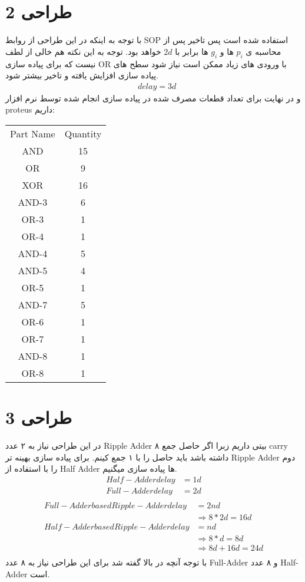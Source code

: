 \documentclass[11pt]{article}
\begin{document}
\section{طراحی 2}
با توجه به اینکه در این طراحی از روابط SOP استفاده شده است پس تاخیر پس از محاسبه ی $p_i$ ها و $g_i$ ها برابر با $2d$ خواهد بود. توجه به این نکته هم خالی از لطف نیست که برای پیاده سازی OR با ورودی های زیاد ممکن است نیاز شود سطح های پیاده سازی افزایش یافته و تاخیر بیشتر شود.
\begin{align*}
	&delay = 3d
\end{align*}
و در نهایت برای تعداد قطعات مصرف شده در پیاده سازی انجام شده توسط نرم افزار proteus داریم:
\begin{center}
	\begin{tabular}{c | c}
		Part Name & Quantity \\
		AND & 15 \\
		OR & 9 \\
		XOR & 16 \\
		AND-3 & 6 \\
		OR-3 & 1 \\
		OR-4 & 1 \\
		AND-4 & 5 \\
		AND-5 & 4 \\
		OR-5 & 1 \\
		AND-7 & 5 \\
		OR-6 & 1 \\
		OR-7 &  1 \\
		AND-8 & 1 \\
		OR-8 & 1 \\
	\end{tabular}
\end{center}
\section{طراحی 3}
در این طراحی نیاز به ۲ عدد Ripple Adder ۸ بیتی داریم زبرا اگر حاصل جمع carry داشته باشد باید حاصل را با ۱ جمع کینم. برای پیاده سازی بهینه تر Ripple Adder دوم را با استفاده از Half Adder ها پیاده سازی میگنیم.
\begin{align*}
	Half-Adder delay &= 1d \\
	Full-Adder delay &= 2d \\
\end{align*}
\begin{align*}
	Full-Adder based Ripple-Adder delay &= 2nd \\
	&\Rightarrow 8 * 2d = 16d \\
	Half-Adder based Ripple-Adder delay &= nd \\
	&\Rightarrow 8 * d = 8d \\
	&\Longrightarrow 8d + 16d = 24d \\
\end{align*}
با توجه آنچه در بالا گفته شد برای این طراحی نیاز به ۸ عدد Full-Adder و ۸ عدد Half-Adder است.
\end{document}
